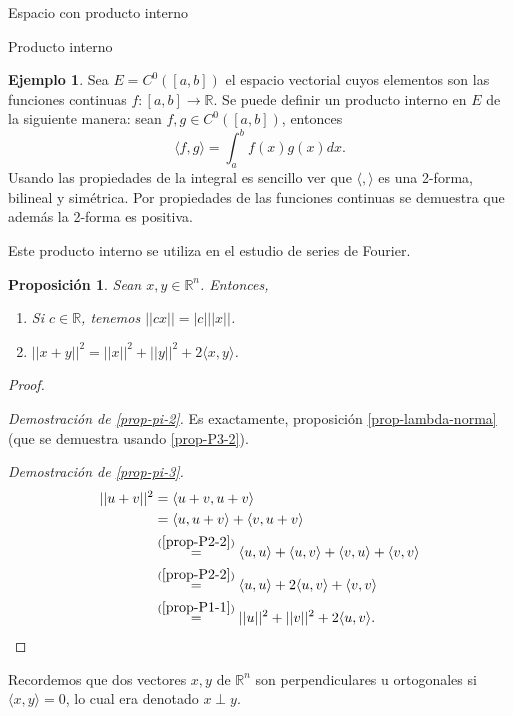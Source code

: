 \documentclass[a4paper,12pt,twoside,spanish,reqno]{amsbook}
\newtheorem{proposicion}[teorema]{Proposici\'on}
\theoremstyle{definition}
\newtheorem{ejemplo}{Ejemplo}[section]
\theoremstyle{remark}
\newcommand{\la}{\langle}
\newcommand{\ra}{\rangle}
\newcommand{\R}{\mathbb R}
\begin{document}
\begin{chapter}{Espacio con producto interno}
\begin{section}{Producto interno}
\begin{ejemplo}
			Sea $E = C^0([a,b])$ el espacio vectorial cuyos elementos son las funciones continuas $f: [a, b] \to\R$. Se puede definir un producto interno en $E$ de la siguiente manera: sean $f,g \in  C^0([a,b])$,  entonces
			\begin{equation*}
			\la f, g \ra = \int_a^b f(x)g(x) dx.
			\end{equation*}
			Usando las propiedades de la integral es sencillo ver que $\la , \ra $ es una 2-forma, bilineal y simétrica. Por propiedades de las funciones continuas se demuestra que además la 2-forma es positiva. 
			
			Este producto interno se utiliza en el estudio de series de Fourier.
		\end{ejemplo}
			
			
		
		
		\begin{proposicion} Sean   $x,y \in \R^n$. Entonces, 
			\begin{enumerate}
				\item\label{prop-pi-2} Si $c \in \R$, tenemos $||cx|| = |c|||x||$.
				\item\label{prop-pi-3} $||x+y||^2 = ||x||^2 + ||y||^2 + 2\la x,y\ra$. 
			\end{enumerate}
		\end{proposicion}
		\begin{proof}
			
			${}^{}$
			
			\textit{Demostración de \ref{prop-pi-2}.}  Es exactamente, proposición \ref{prop-lambda-norma} (que se demuestra usando \ref{prop-P3-2}).
			
			\textit{Demostración de \ref{prop-pi-3}.}
			\begin{align*}
				||u+v||^2 &= \la u+v,u+v\ra\\
				&= \la u,u+v\ra+ \la v,u+v\ra  \\
				&\overset{(\ref{prop-P2-2})}{=} \la u,u\ra+ \la u,v\ra+\la v,u\ra+ \la v,v\ra  \\
				&\overset{(\ref{prop-P2-2})}{=} \la u,u\ra+ 2\la u,v\ra+ \la v,v\ra  \\
				&\overset{(\ref{prop-P1-1})}{=} ||u||^2 + ||v||^2 + 2\la u,v\ra.
			\end{align*}
			
			
		\end{proof}
		
		\medskip
		
		Recordemos que dos vectores $x,y$  de $\R^n$ son perpendiculares u ortogonales si $\la x,y\ra =0$, lo cual era denotado $x \perp y$. 
		

\end{section}
\end{chapter}
\end{document}
